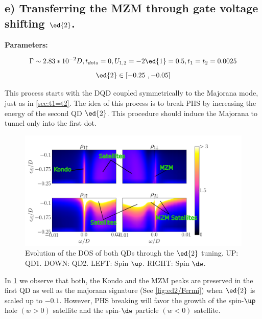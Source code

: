 
\subsection{ e) Transferring the MZM through gate voltage shifting $\ed{2}$. \label{sec:e2}}

\textbf{Parameters:}

$$\Gamma \sim 2.83*10^{-2}D, t_{dots}=0 , U_{1,2} = -2\ed{1} = 0.5 , t_1=t_2=0.0025$$
$$\ed{2} \in [-0.25 \  , -0.05]$$

This process starts with the DQD coupled symmetrically  to the Majorana mode, just as in \ref{sec:t1=t2}. The idea of this process is to break PHS by increasing the energy of the second QD $\ed{2}$. This procedure should induce the Majorana to tunnel only into the first dot. 


\begin{figure}[h]
\centering
\includegraphics[scale=0.35]{IMAGES/ed2/2D.png}
\caption{\label{fig:2D/Shift_ed2} Evolution of the DOS of both QDs through the $\ed{2}$ tuning. UP: QD1. DOWN: QD2. LEFT: Spin $\up$. RIGHT: Spin $\dw$.}
\end{figure}


In \ref{fig:2D/Shift_ed2} we observe that both, the Kondo and the MZM peaks are preserved in the first QD as well as the majorana signature (See \ref{fig:ed2/Fermi}) when $\ed{2}$ is scaled up to $-0.1$.  However,  PHS breaking will favor the growth of the spin-$\up$ hole $(w>0)$  satellite and the spin-$\dw$ particle $(w<0)$ satellite.




